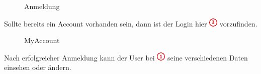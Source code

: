\documentclass[11pt,ngerman]{article}
\begin{document}
    \begin{figure}[H]
    	\centering
    	\caption{Anmeldung}
    	\label{fig:Anmeldung}
    \end{figure}
    
    Sollte bereits ein Account vorhanden sein, dann ist der Login hier \includegraphics{figures/3.png} vorzufinden.
    
    \begin{figure}[H]
    	\centering
    	\caption{MyAccount}
    	\label{fig:MyAccount}
    \end{figure}
    
    
    Nach erfolgreicher Anmeldung kann der User bei \includegraphics{figures/1.png} seine verschiedenen Daten einsehen oder ändern. 
    
    
    
    
    
\end{document}
